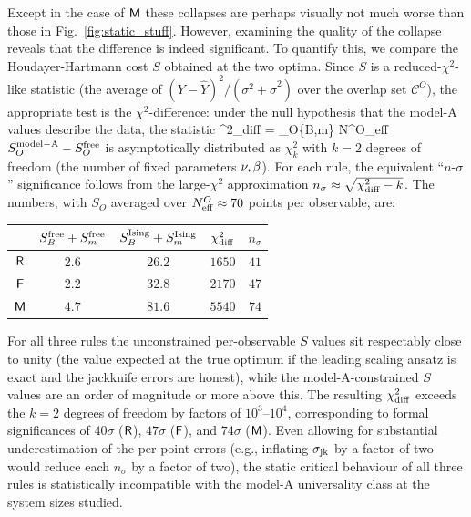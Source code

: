 \documentclass[pra,aps,twocolumn,groupedaddress,superscriptaddress,nofootinbib,preprintnumbers]{revtex4-2}
\begin{document}
\begin{widetext}
		Except in the case of $\mathsf{M}$ these collapses are perhaps visually not much worse than those in Fig.~\ref{fig:static_stuff}. However, examining the quality of the collapse reveals that the difference is indeed significant. To quantify this, we compare the Houdayer-Hartmann cost $S$ obtained at the two optima. Since $S$ is a reduced-$\chi^2$-like statistic (the average of $(Y-\hat Y)^2/(\sigma^2+\hat\sigma^2)$ over the overlap set $\mathcal{C}^O$), the appropriate test is the $\chi^2$-difference: under the null hypothesis that the model-A values describe the data, the statistic
		\be \chi^2_{\rm diff} = \sum_{O\in\{B,m\}} N^O_{\rm eff} \(S^{\rm model-A}_O - S^{\rm free}_O\) \ee
		is asymptotically distributed as $\chi^2_k$ with $k=2$ degrees of freedom (the number of fixed parameters $\nu,\beta$). For each rule, the equivalent ``$n$-$\sigma$'' significance follows from the large-$\chi^2$ approximation $n_\sigma \approx \sqrt{\chi^2_{\rm diff} - k}$. The numbers, with $S_O$ averaged over $N^O_{\rm eff} \approx 70$ points per observable, are:
		\begin{center}
			\renewcommand{\arraystretch}{1.15}
			\begin{tabular}{c|cccc}
				& $S^{\rm free}_B + S^{\rm free}_m$ & $S^{\rm Ising}_B + S^{\rm Ising}_m$ & $\chi^2_{\rm diff}$ & $n_\sigma$ \\ \hline
				$\mathsf{R}$ & $2.6$  & $26.2$ & $1650$ & $41$ \\
				$\mathsf{F}$ & $2.2$  & $32.8$ & $2170$ & $47$ \\
				$\mathsf{M}$ & $4.7$  & $81.6$ & $5540$ & $74$ \\
			\end{tabular}
		\end{center}
		For all three rules the unconstrained per-observable $S$ values sit respectably close to unity (the value expected at the true optimum if the leading scaling ansatz is exact and the jackknife errors are honest), while the model-A-constrained $S$ values are an order of magnitude or more above this. The resulting $\chi^2_{\rm diff}$ exceeds the $k=2$ degrees of freedom by factors of $10^3$--$10^4$, corresponding to formal significances of $40\sigma$ ($\mathsf{R}$), $47\sigma$ ($\mathsf{F}$), and $74\sigma$ ($\mathsf{M}$). Even allowing for substantial underestimation of the per-point errors (e.g., inflating $\sigma_{\rm jk}$ by a factor of two would reduce each $n_\sigma$ by a factor of two), the static critical behaviour of all three rules is statistically incompatible with the model-A universality class at the system sizes studied.
		

\end{widetext}
\end{document}
